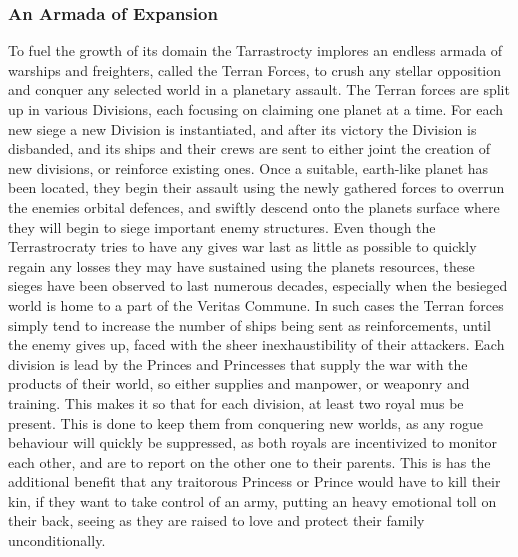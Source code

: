 \documentclass[a4paper,12pt]{report}
\begin{document}
\subsubsection*{An Armada of Expansion}
To fuel the growth of its domain the Tarrastrocty implores an endless armada of warships and freighters, called the Terran Forces, to crush any stellar opposition and conquer any selected world in a planetary assault. The Terran forces are split up in various Divisions, each focusing on claiming one planet at a time. For each new siege a new Division is instantiated, and after its victory the Division is disbanded, and its ships and their crews are sent to either joint the creation of new divisions, or reinforce existing ones. Once a suitable, earth-like planet has been located, they begin their assault using the newly gathered forces to overrun the enemies orbital defences, and swiftly descend onto the planets surface where they will begin to siege important enemy structures. Even though the Terrastrocraty tries to have any gives war last as little as possible to quickly regain any losses they may have sustained using the planets resources, these sieges have been observed to last numerous decades, especially when the besieged world is home to a part of the Veritas Commune. In such cases the Terran forces simply tend to increase the number of ships being sent as reinforcements, until the enemy gives up, faced with the sheer inexhaustibility of their attackers. Each division is lead by the Princes and Princesses that supply the war with the products of their world, so either supplies and manpower, or weaponry and training. This makes it so that for each division, at least two royal mus be present. This is done to keep them from conquering new worlds, as any rogue behaviour will quickly be suppressed, as both royals are incentivized to monitor each other, and are to report on the other one to their parents. This is has the additional benefit that any traitorous Princess or Prince would have to kill their kin, if they want to take control of an army, putting an heavy emotional toll on their back, seeing as they are raised to love and protect their family unconditionally.\\
\\
\end{document}
